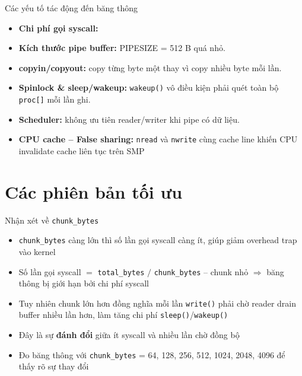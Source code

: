 \documentclass[aspectratio=169]{beamer}
\begin{document}
\begin{frame}{Các yếu tố tác động đến băng thông}
    \begin{itemize}\setlength\itemsep{8pt}
        \item \textbf{Chi phí gọi syscall:}
        \item \textbf{Kích thước pipe buffer:} PIPESIZE = 512 B quá nhỏ.
        \item \textbf{copyin/copyout:} copy từng byte một thay vì copy nhiều byte mỗi lần.
        \item \textbf{Spinlock \& sleep/wakeup:} \texttt{wakeup()} vô điều kiện phải quét toàn bộ \texttt{proc[]} mỗi lần ghi.
        \item \textbf{Scheduler:} không ưu tiên reader/writer khi pipe có dữ liệu.
        \item \textbf{CPU cache -- False sharing:} \texttt{nread} và \texttt{nwrite} cùng cache line khiến CPU invalidate cache liên tục trên SMP
    \end{itemize}
\end{frame}


\section{Các phiên bản tối ưu}

\begin{frame}{Nhận xét về \texttt{chunk\_bytes}}
    \begin{itemize}\setlength\itemsep{10pt}
        \item \texttt{chunk\_bytes} càng lớn thì số lần gọi syscall càng ít, giúp giảm overhead trap vào kernel
        \item Số lần gọi syscall $=$ \texttt{total\_bytes} $/$ \texttt{chunk\_bytes} -- chunk nhỏ $\Rightarrow$ băng thông bị giới hạn bởi chi phí syscall
        \item Tuy nhiên chunk lớn hơn đồng nghĩa mỗi lần \texttt{write()} phải chờ reader drain buffer nhiều lần hơn, làm tăng chi phí \texttt{sleep()}/\texttt{wakeup()}
        \item Đây là sự \textbf{đánh đổi} giữa ít syscall và nhiều lần chờ đồng bộ
        \item Đo băng thông với \texttt{chunk\_bytes} = 64, 128, 256, 512, 1024, 2048, 4096 để thấy rõ sự thay đổi
    \end{itemize}
\end{frame}
\end{document}
